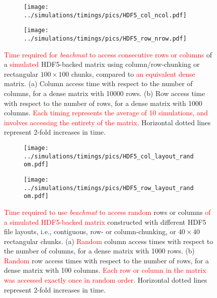 \documentclass{article}
\newcommand{\beachmat}{\textit{beachmat}}
\newcommand{\revised}[1]{\textcolor{red}{#1}}
\begin{document}
\begin{figure}[bt]
    \begin{subfigure}[b]{0.49\textwidth}
        \texttt{[image: ../simulations/timings/pics/HDF5\_col\_ncol.pdf]}
        \caption{}
    \end{subfigure}
    \begin{subfigure}[b]{0.49\textwidth}
        \texttt{[image: ../simulations/timings/pics/HDF5\_row\_nrow.pdf]}
        \caption{}
    \end{subfigure}
    \caption{\revised{Time required for \beachmat{} to access consecutive rows or columns} of a \revised{simulated} HDF5-backed matrix using column/row-chunking or rectangular $100\times100$ chunks, compared to \revised{an equivalent dense} matrix.
        (a) Column access time with respect to the number of columns, for a dense matrix with 10000 rows.
        (b) Row access time with respect to the number of rows, for a dense matrix with 1000 columns.
        \revised{Each timing represents the average of 10 simulations, and involves accessing the entirety of the matrix.}
        Horizontal dotted lines represent 2-fold increases in time.
    }
    \label{fig:hdf5time}
\end{figure}

\begin{figure}[bt]
    \begin{subfigure}[b]{0.49\textwidth}
        \texttt{[image: ../simulations/timings/pics/HDF5\_col\_layout\_random.pdf]}
        \caption{}
    \end{subfigure}
    \begin{subfigure}[b]{0.49\textwidth}
        \texttt{[image: ../simulations/timings/pics/HDF5\_row\_layout\_random.pdf]}
        \caption{}
    \end{subfigure}
    \caption{\revised{Time required to use \beachmat{} to access random} rows or columns \revised{of a simulated HDF5-backed matrix} constructed with different HDF5 file layouts, 
        i.e., contiguous, row- or column-chunking, or $40\times40$ rectangular chunks.
        (a) \revised{Random} column access times with respect to the number of columns, for a dense matrix with 1000 rows.
        (b) \revised{Random} row access times with respect to the number of rows, for a dense matrix with 100 columns.
        \revised{Each row or column in the matrix was accessed exactly once in random order.}
        Horizontal dotted lines represent 2-fold increases in time.
    }
    \label{fig:hdf5layout}
\end{figure}
\end{document}
